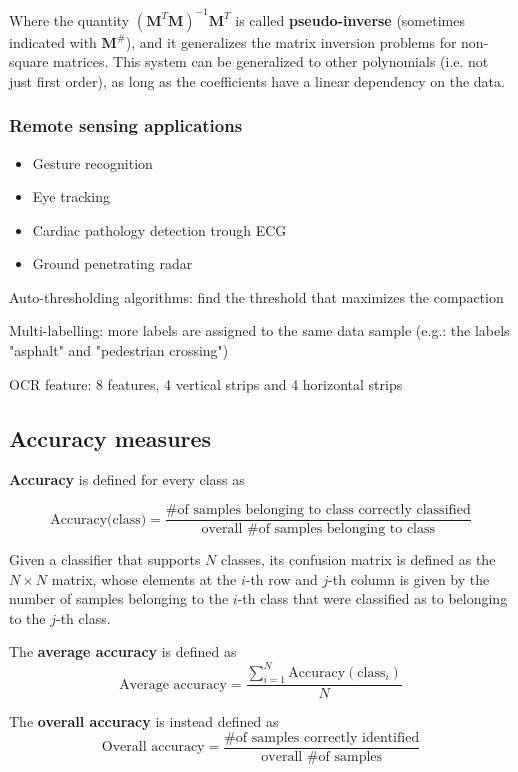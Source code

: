 \documentclass[oneside,onecolumn]{report}
\begin{document}
Where the quantity $\left(\bm M^T \bm M \right)^{-1} \bm M^T$ is called \textbf{pseudo-inverse} (sometimes indicated with $\bm M^\#$), and it generalizes the matrix inversion problems for non-square matrices. This system can be generalized to other polynomials (i.e. not just first order), as long as the coefficients have a linear dependency on the data.

\subsubsection{Remote sensing applications}
\begin{itemize}
    \item Gesture recognition
    \item Eye tracking
    \item Cardiac pathology detection trough ECG
    \item Ground penetrating radar
\end{itemize}

Auto-thresholding algorithms: find the threshold that maximizes the compaction

Multi-labelling: more labels are assigned to the same data sample (e.g.: the labels "asphalt" and "pedestrian crossing")

OCR feature: 8 features, 4 vertical strips and 4 horizontal strips

\subsection{Accuracy measures}

\textbf{Accuracy} is defined for every class as

$$ \text{Accuracy(class)} = \frac{\text{\# of samples belonging to class correctly classified}}{\text{overall \# of samples belonging to class}} $$

Given a classifier that supports $N$ classes, its confusion matrix is defined as the $N\times N$ matrix, whose elements at the $i$-th row and $j$-th column is given by the number of samples belonging to the $i$-th class that were classified as to belonging to the $j$-th class.

The \textbf{average accuracy} is defined as
$$ \text{Average accuracy} = \frac{\sum_{i=1}^N \text{Accuracy}(\text{class}_i)}{N} $$

The \textbf{overall accuracy} is instead defined as
$$ \text{Overall accuracy} = \frac{\text{\# of samples correctly identified}}{\text{overall \# of samples}} $$
\end{document}
